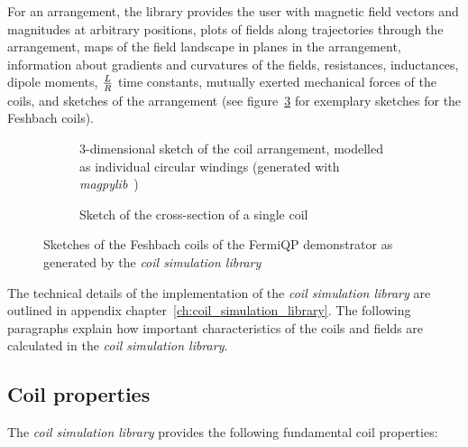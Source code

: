 For an arrangement, the library provides the user with magnetic field vectors and magnitudes at arbitrary positions, plots of fields along trajectories through the arrangement, maps of the field landscape in planes in the arrangement, information about gradients and curvatures of the fields, resistances, inductances, dipole moments, $L\over R$ time constants, mutually exerted mechanical forces of the coils, and sketches of the arrangement (see figure~\ref{fig:csl_sketches} for exemplary sketches for the Feshbach coils).

\begin{figure}
    \centering
    \begin{subfigure}[t]{0.47\textwidth}
        \centering
        \resizebox{\textwidth}{!}{
            \begin{pgfpicture}
                \pgftext{}
            \end{pgfpicture}
        }
        \caption{3-dimensional sketch of the coil arrangement, modelled as individual circular windings (generated with \textit{magpylib}~\cite{noauthor_magpylibmagpylib_nodate})}
        \label{fig:csl_sketches_3d}
    \end{subfigure}
    \hspace{0.04\textwidth}
    \begin{subfigure}[t]{0.47\textwidth}
        \centering
        \resizebox{\textwidth}{!}{
            \begin{pgfpicture}
                \pgftext{}
            \end{pgfpicture}
        }
        \caption{Sketch of the cross-section of a single coil}
        \label{fig:csl_sketches_cross_section}
    \end{subfigure}
    \caption{Sketches of the Feshbach coils of the FermiQP demonstrator as generated by the \textit{coil simulation library}}
    \label{fig:csl_sketches}
\end{figure}

The technical details of the implementation of the \textit{coil simulation library} are outlined in appendix chapter~\ref{ch:coil_simulation_library}. The following paragraphs explain how important characteristics of the coils and fields are calculated in the \textit{coil simulation library}.

\subsection*{Coil properties}
The \textit{coil simulation library} provides the following fundamental coil properties:
